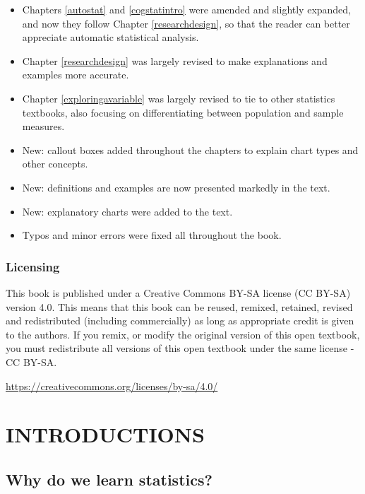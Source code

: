 \documentclass[
  11pt,
]{book}
\providecommand{\tightlist}{%
  \setlength{\itemsep}{0pt}\setlength{\parskip}{0pt}}
\theoremstyle{definition}
\theoremstyle{definition}
\theoremstyle{definition}
\theoremstyle{definition}
\theoremstyle{remark}
\begin{document}
\begin{itemize}
\tightlist
\item
  Chapters \ref{autostat} and \ref{cogstatintro} were amended and slightly expanded, and now they follow Chapter \ref{researchdesign}, so that the reader can better appreciate automatic statistical analysis.
\item
  Chapter \ref{researchdesign} was largely revised to make explanations and examples more accurate.
\item
  Chapter \ref{exploringavariable} was largely revised to tie to other statistics textbooks, also focusing on differentiating between population and sample measures.
\item
  New: callout boxes added throughout the chapters to explain chart types and other concepts.
\item
  New: definitions and examples are now presented markedly in the text.
\item
  New: explanatory charts were added to the text.
\item
  Typos and minor errors were fixed all throughout the book.
\end{itemize}

\hypertarget{licensing}{%
\section*{Licensing}\label{licensing}}

This book is published under a Creative Commons BY-SA license (CC BY-SA) version 4.0. This means that this book can be reused, remixed, retained, revised and redistributed (including commercially) as long as appropriate credit is given to the authors. If you remix, or modify the original version of this open textbook, you must redistribute all versions of this open textbook under the same license - CC BY-SA.

\url{https://creativecommons.org/licenses/by-sa/4.0/}

\hypertarget{part-introductions}{%
\part*{INTRODUCTIONS}\label{part-introductions}}

\hypertarget{whywhywhy}{%
\chapter{Why do we learn statistics?}\label{whywhywhy}}
\end{document}
